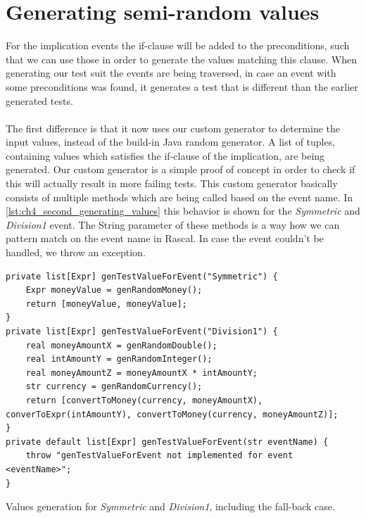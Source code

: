 \section{Generating semi-random values}
For the implication events the if-clause will be added to the preconditions, such that we can use those in order to generate the values matching this clause. When generating our test suit the events are being traversed, in case an event with some preconditions was found, it generates a test that is different than the earlier generated tests.\\
\\
The first difference is that it now uses our custom generator to determine the input values, instead of the build-in Java random generator. A list of tuples, containing values which satisfies the if-clause of the implication, are being generated. Our custom generator is a simple proof of concept in order to check if this will actually result in more failing tests. This custom generator basically consists of multiple methods which are being called based on the event name. In \autoref{lst:ch4_second_generating_values} this behavior is shown for the \textit{Symmetric} and \textit{Division1} event. The String parameter of these methods is a way how we can pattern match on the event name in Rascal. In case the event couldn't be handled, we throw an exception.
\\
\begin{sourcecode}[h!]
\begin{lstlisting}[language=Rascal]
private list[Expr] genTestValueForEvent("Symmetric") {
    Expr moneyValue = genRandomMoney();
    return [moneyValue, moneyValue];
}
private list[Expr] genTestValueForEvent("Division1") {
    real moneyAmountX = genRandomDouble();
    real intAmountY = genRandomInteger();
    real moneyAmountZ = moneyAmountX * intAmountY;
    str currency = genRandomCurrency();
    return [convertToMoney(currency, moneyAmountX), converToExpr(intAmountY), convertToMoney(currency, moneyAmountZ)];
}
private default list[Expr] genTestValueForEvent(str eventName) {
    throw "genTestValueForEvent not implemented for event <eventName>";
}
\end{lstlisting}
\caption{Values generation for \textit{Symmetric} and \textit{Division1}, including the fall-back case.}
\label{lst:ch4_second_generating_values}
\end{sourcecode}
